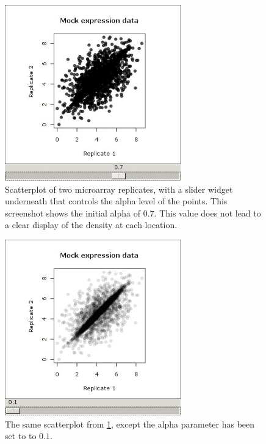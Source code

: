 \documentclass[article,shortnames]{jss}
\begin{document}



\begin{figure}[h!tbp]
\begin{center}
\includegraphics[width=3in]{demo-alpha-random-07-3}
\caption{\label{fig:rgtk2-demo-initial}Scatterplot of two microarray
replicates,
with a slider widget underneath that controls the alpha level of the
points. This screenshot shows the initial alpha of $0.7$.
This value does not lead to a clear display of the density at each
location.
}
\end{center}
\end{figure}

\begin{figure}[h!tbp]
\begin{center}
\includegraphics[width=3in]{demo-alpha-random-01-3}
\caption{\label{fig:rgtk2-demo-final}The same scatterplot from 
\ref{fig:rgtk2-demo-initial}, except the alpha parameter has been set
to to
$0.1$.}
\end{center}
\end{figure}
\end{document}
